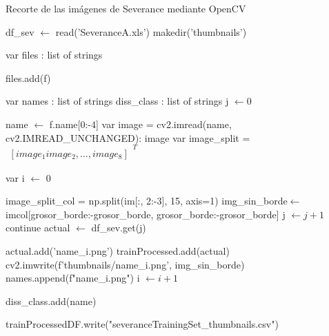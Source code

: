  \begin{algorithm}[!ht]
	\label{cortarseverance}
	\caption{Recorte de las imágenes de Severance mediante OpenCV}
	\begin{algorithmic}
		
		\State  df\_sev $\gets$ read('SeveranceA.xls')
		\State makedir('thumbnails')
		\EndIf
		
		\State var files : list of strings
		
		\If {f is\_file()]}
		\State files.add(f)
		\EndIf
		\EndFor
		
		\State var names : list of strings
		\State diss\_class : list of strings
		\State j $\gets 0$
		
		\State name $\gets$ f.name[0:-4]
		\State var image = cv2.imread(name, cv2.IMREAD\_UNCHANGED): image
		\State var image\_split = $\begin{matrix}
			[ image_1 image_2, \ldots, image_8 ] \end{matrix}^T$	
		
		
		\State var i $\gets$ 0
		
		\State image\_split\_col = np.split(im[:, 2:-3], 15, axis=1)
		\State img\_sin\_borde$\gets$ imcol[grosor\_borde:-grosor\_borde, grosor\_borde:-grosor\_borde]
		  
		\State j $\gets j + 1$  
		\State continue
		\Else
		\State actual  $\gets$ df\_sev.get(j)
		
		\State	actual.add('{name}\_{i}.png')
		\State	trainProcessed.add(actual)
		\EndIf
		\State cv2.imwrite(f'thumbnails/{name}\_{i}.png', img\_sin\_borde)
		\State names.append(f"{name}\_{i}.png")
		\State i $\gets i + 1 $
		
		\State diss\_class.add(name)
		\EndFor
		
		\EndFor
		\EndIf	 
		\EndFor
		\State trainProcessedDF.write("severanceTrainingSet\_thumbnails.csv") 
		\EndProcedure
	\end{algorithmic}
\end{algorithm}
 
